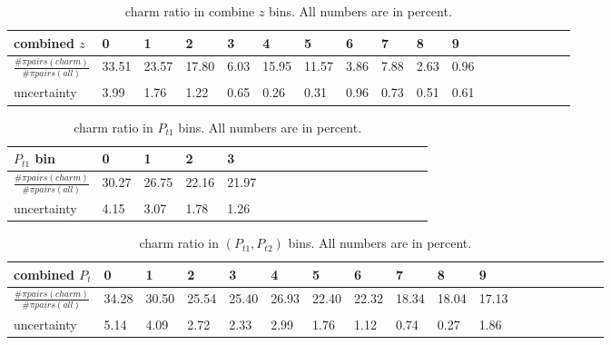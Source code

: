 \begin{table}[H]\footnotesize
\centering
\begin{tabular}{|l|l|l|l|l|l|l|l|l|l|l|l|l|l|l|l|l|l|}
\hline
combined $z$ & 0 & 1 & 2 & 3 & 4 & 5 & 6 & 7 & 8 & 9 \\ \hline
$\frac{\# \pi pairs(charm)}{\# \pi pairs(all)}$ & 33.51 & 23.57 & 17.80 & 6.03 & 15.95 & 11.57 & 3.86 & 7.88 & 2.63 & 0.96\\ \hline
uncertainty & 3.99 & 1.76 & 1.22 & 0.65 & 0.26 & 0.31 & 0.96 & 0.73 & 0.51 & 0.61 \\ \hline
\end{tabular}
\caption{charm ratio in combine $z$ bins. All numbers are in percent.}
\label{tab:comzcharmratio}
\end{table}

\begin{table}[H]\footnotesize
\centering
\begin{tabular}{|l|l|l|l|l|l|l|l|l|l|l|l|l|l|l|l|l|l|}
\hline
$P_{t1}$ bin & 0 & 1 & 2 & 3 \\ \hline
$\frac{\# \pi pairs(charm)}{\# \pi pairs(all)}$  & 30.27 & 26.75 & 22.16 & 21.97 \\ \hline
uncertainty &   4.15 & 3.07 & 1.78 & 1.26 \\ \hline
\end{tabular}
\caption{charm ratio in $P_{t1}$ bins. All numbers are in percent.}
\label{tab:sinptcharmratio}
\end{table}

\begin{table}[H]\footnotesize
\centering
\begin{tabular}{|l|l|l|l|l|l|l|l|l|l|l|l|l|l|l|l|l|l|}
\hline
combined $P_t$ & 0 & 1 & 2 & 3 & 4 & 5 & 6 & 7 & 8 & 9 \\ \hline
$\frac{\# \pi pairs(charm)}{\# \pi pairs(all)}$ & 34.28 & 30.50 & 25.54 & 25.40 & 26.93 & 22.40 & 22.32 & 18.34 & 18.04 & 17.13 \\ \hline
uncertainty & 5.14 & 4.09 & 2.72 & 2.33 & 2.99 & 1.76 & 1.12 & 0.74 & 0.27 & 1.86  \\ \hline
\end{tabular}
\caption{charm ratio in $(P_{t1},P_{t2})$ bins. All numbers are in percent.}
\label{tab:comptcharmratio}
\end{table}
\fi
